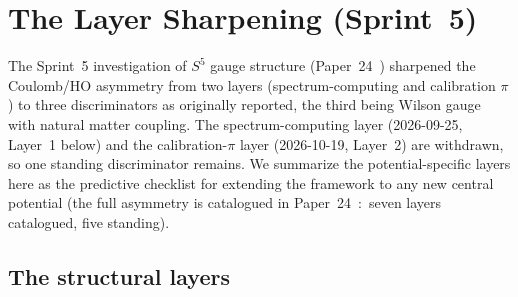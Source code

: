 \documentclass[twocolumn,pra,amsmath,amssymb,superscriptaddress]{revtex4-2}
\begin{document}
\section{The Layer Sharpening (Sprint~5)}
\label{sec:five-layers}

The Sprint~5 investigation of $S^5$ gauge structure (Paper~24~\cite{paper24})
sharpened the Coulomb/HO asymmetry from two layers
(spectrum-computing and calibration $\pi$) to three discriminators as
originally reported, the third being Wilson gauge with natural matter
coupling.  The spectrum-computing layer (2026-09-25, Layer~1 below) and
the calibration-$\pi$ layer (2026-10-19, Layer~2) are withdrawn, so one
standing discriminator remains.  We summarize the
potential-specific layers here as the predictive checklist for
extending the framework to any new central potential (the full
asymmetry is catalogued in Paper~24~\cite{paper24}:\ seven layers
catalogued, five standing).

\subsection{The structural layers}
\end{document}
